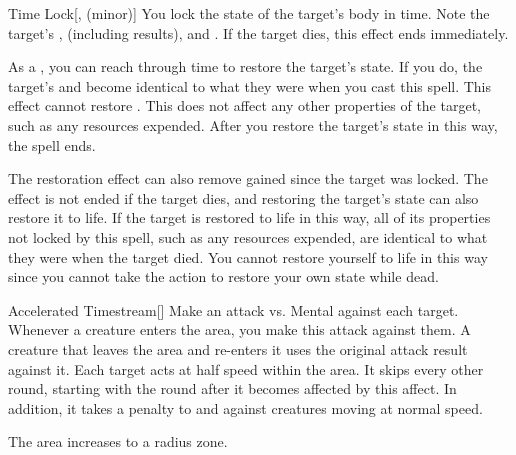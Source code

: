 \lowercase{\hypertarget{spell:Time Lock}{}}\label{spell:Time Lock}
\begin{freeability}[Rank 4]{\hypertarget{spell:Time Lock}{Time Lock}}[,  (minor)]
You lock the state of the target's body in time.
Note the target's ,  (including  results), and .
If the target dies, this effect ends immediately.

As a , you can reach through time to restore the target's state.
If you do, the target's  and  become identical to what they were when you cast this spell.
This effect cannot restore .
This does not affect any other properties of the target, such as any resources expended.
After you restore the target's state in this way, the spell ends.

\rankline
{} The restoration effect can also remove  gained since the target was locked.
 The effect is not ended if the target dies, and restoring the target's state can also restore it to life.
If the target is restored to life in this way, all of its properties not locked by this spell, such as any resources expended, are identical to what they were when the target died.
You cannot restore yourself to life in this way since you cannot take the action to restore your own state while dead.
\end{freeability}
\vspace{0.25em}



\lowercase{\hypertarget{spell:Accelerated Timestream}{}}\label{spell:Accelerated Timestream}
\begin{freeability}[Rank 5]{\hypertarget{spell:Accelerated Timestream}{Accelerated Timestream}}[]
Make an attack vs. Mental against each target.
Whenever a creature enters the area, you make this attack against them.
A creature that leaves the area and re-enters it uses the original attack result against it.
\hit Each target acts at half speed within the area.
It skips every other round, starting with the round after it becomes affected by this affect.
In addition, it takes a  penalty to  and  against creatures moving at normal speed.

\rankline
{} The area increases to a \arealarge radius zone.
\end{freeability}
\vspace{0.25em}



